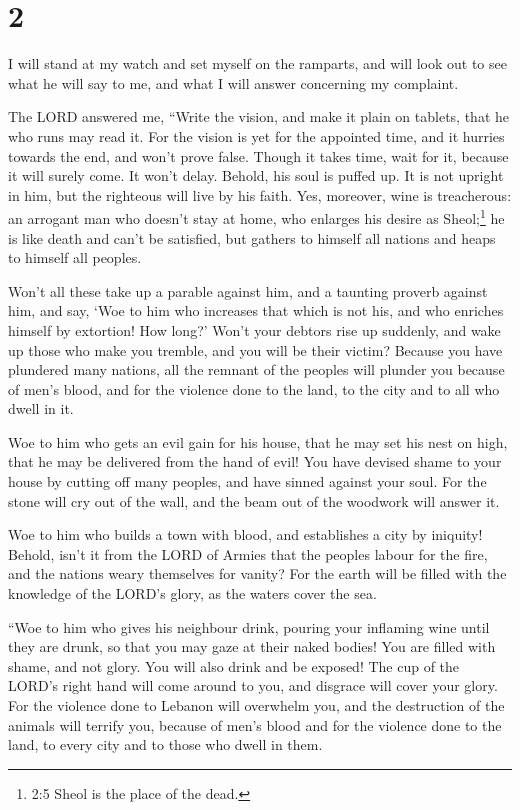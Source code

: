 \hypertarget{section-1}{%
\section{2}\label{section-1}}

 I will stand at my watch and set myself on the ramparts,
and will look out to see what he will say to me, and what I will answer
concerning my complaint.

 The LORD answered me, ``Write the vision, and make it plain
on tablets, that he who runs may read it.  For the vision is
yet for the appointed time, and it hurries towards the end, and won't
prove false. Though it takes time, wait for it, because it will surely
come. It won't delay.  Behold, his soul is puffed up. It is
not upright in him, but the righteous will live by his faith.
 Yes, moreover, wine is treacherous: an arrogant man who
doesn't stay at home, who enlarges his desire as Sheol;\footnote{2:5
  Sheol is the place of the dead.} he is like death and can't be
satisfied, but gathers to himself all nations and heaps to himself all
peoples.

 Won't all these take up a parable against him, and a
taunting proverb against him, and say, `Woe to him who increases that
which is not his, and who enriches himself by extortion! How long?'
 Won't your debtors rise up suddenly, and wake up those who
make you tremble, and you will be their victim?  Because you
have plundered many nations, all the remnant of the peoples will plunder
you because of men's blood, and for the violence done to the land, to
the city and to all who dwell in it.

 Woe to him who gets an evil gain for his house, that he may
set his nest on high, that he may be delivered from the hand of evil!
 You have devised shame to your house by cutting off many
peoples, and have sinned against your soul.  For the stone
will cry out of the wall, and the beam out of the woodwork will answer
it.

 Woe to him who builds a town with blood, and establishes a
city by iniquity!  Behold, isn't it from the LORD of Armies
that the peoples labour for the fire, and the nations weary themselves
for vanity?  For the earth will be filled with the
knowledge of the LORD's glory, as the waters cover the sea.

 ``Woe to him who gives his neighbour drink, pouring your
inflaming wine until they are drunk, so that you may gaze at their naked
bodies!  You are filled with shame, and not glory. You will
also drink and be exposed! The cup of the LORD's right hand will come
around to you, and disgrace will cover your glory.  For the
violence done to Lebanon will overwhelm you, and the destruction of the
animals will terrify you, because of men's blood and for the violence
done to the land, to every city and to those who dwell in them.

